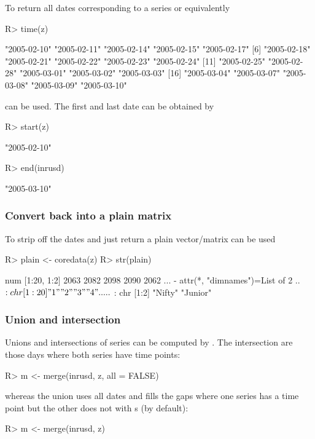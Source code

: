 \documentclass[article,nojss]{jss}
\newcommand{\mysection}[1]{\subsubsection[#1]{\textbf{#1}}}
\begin{document}
To return all dates corresponding to a series
 or equivalently 
\begin{Schunk}
\begin{Sinput}
R> time(z)
\end{Sinput}
\begin{Soutput}
 [1] "2005-02-10" "2005-02-11" "2005-02-14" "2005-02-15" "2005-02-17"
 [6] "2005-02-18" "2005-02-21" "2005-02-22" "2005-02-23" "2005-02-24"
[11] "2005-02-25" "2005-02-28" "2005-03-01" "2005-03-02" "2005-03-03"
[16] "2005-03-04" "2005-03-07" "2005-03-08" "2005-03-09" "2005-03-10"
\end{Soutput}
\end{Schunk}
can be used. The first and last date can be obtained by
\begin{Schunk}
\begin{Sinput}
R> start(z)
\end{Sinput}
\begin{Soutput}
[1] "2005-02-10"
\end{Soutput}
\begin{Sinput}
R> end(inrusd)
\end{Sinput}
\begin{Soutput}
[1] "2005-03-10"
\end{Soutput}
\end{Schunk}

\mysection{Convert back into a plain matrix}

To strip off the dates and just return a plain vector/matrix
 can be used
\begin{Schunk}
\begin{Sinput}
R> plain <- coredata(z)
R> str(plain)
\end{Sinput}
\begin{Soutput}
 num [1:20, 1:2] 2063 2082 2098 2090 2062 ...
 - attr(*, "dimnames")=List of 2
  ..$ : chr [1:20] "1" "2" "3" "4" ...
  ..$ : chr [1:2] "Nifty" "Junior"
\end{Soutput}
\end{Schunk}

\mysection{Union and intersection}

Unions and intersections of series can be computed by . The
intersection are those days where both series have time points:
\begin{Schunk}
\begin{Sinput}
R> m <- merge(inrusd, z, all = FALSE)
\end{Sinput}
\end{Schunk}
whereas the union uses all dates and fills the gaps where one
series has a time point but the other does not 
with s (by default):
\begin{Schunk}
\begin{Sinput}
R> m <- merge(inrusd, z)
\end{Sinput}
\end{Schunk}
\end{document}
